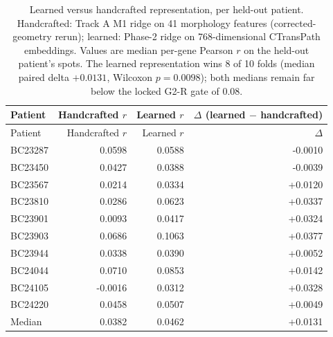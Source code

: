 \begin{longtable}{lrrr}
\caption{Learned versus handcrafted representation, per held-out patient. Handcrafted:
Track A M1 ridge on 41 morphology features (corrected-geometry rerun); learned: Phase-2
ridge on 768-dimensional CTransPath embeddings. Values are median per-gene Pearson $r$
on the held-out patient's spots. The learned representation wins 8 of 10 folds (median
paired delta $+0.0131$, Wilcoxon $p=0.0098$); both medians remain far below the locked
G2-R gate of $0.08$.}\label{tab:learned-vs-handcrafted}\\
\toprule
Patient & Handcrafted $r$ & Learned $r$ & $\Delta$ (learned $-$ handcrafted) \\
\midrule
\endfirsthead
\toprule
Patient & Handcrafted $r$ & Learned $r$ & $\Delta$ \\
\midrule
\endhead
BC23287 & 0.0598 & 0.0588 & -0.0010 \\
BC23450 & 0.0427 & 0.0388 & -0.0039 \\
BC23567 & 0.0214 & 0.0334 & +0.0120 \\
BC23810 & 0.0286 & 0.0623 & +0.0337 \\
BC23901 & 0.0093 & 0.0417 & +0.0324 \\
BC23903 & 0.0686 & 0.1063 & +0.0377 \\
BC23944 & 0.0338 & 0.0390 & +0.0052 \\
BC24044 & 0.0710 & 0.0853 & +0.0142 \\
BC24105 & -0.0016 & 0.0312 & +0.0328 \\
BC24220 & 0.0458 & 0.0507 & +0.0049 \\
\midrule
Median & 0.0382 & 0.0462 & +0.0131 \\
\bottomrule
\end{longtable}
